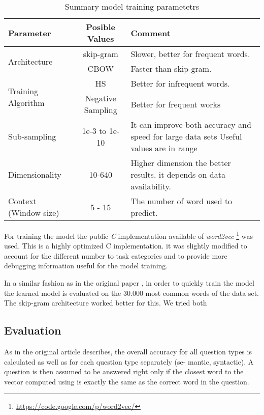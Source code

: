 \begin{table}[h]
   \centering
   \caption{Summary model training parametetrs} 
   \label{tab:word2_vec_parameters}
   
   \small
   \begin{tabular}{ |l|c|p{5cm}| }
   \hline           
    Parameter &  Posible Values & Comment \\  \hline           
    \multirow{2}{*}{Architecture}  & skip-gram  & Slower, better for frequent
    words. \\ 
    \cline{2-3}
    & CBOW  &  Faster than skip-gram. \\ \hline
    \multirow{2}{*}{Training Algorithm}  & \ac{HS}  & Better for infrequent words.   \\ 
    \cline{2-3}
    & Negative Sampling & Better for frequent works \\ \hline
    Sub-sampling  & 1e-3 to 1e-10  &  It  can improve both accuracy and speed for large data
    sets Useful values are in range \\ \hline
    Dimensionality  & 10-640 & Higher dimension the better results. 
    it depends on data availability.  \\ \hline
    Context (Window size)  & 5 - 15 & The number of word used to predict. \\ \hline

    
\end{tabular}
\end{table}

For training  the model the public \emph{C} implementation available of
\textit{word2vec} \footnote{\url{https://code.google.com/p/word2vec/}} was
used.  This is a highly optimized C implementation. it was slightly modified to account for the different
number to task categories and to provide more debugging information useful
for the model training. 

In a similar fashion as in the original paper
\cite{DBLP:journals/corr/abs-1301-3781},  in order to quickly train the model
the  learned model is evaluated on  the 30.000 most common words of the
data set. The skip-gram architecture worked better for this.  We tried both 

\subsection{Evaluation}
\label{experiments:sub:evaluation}

As in the original article describes, the overall accuracy for all question
types is calculated as well as  for each question type separately (se-
mantic, syntactic). A question is then assumed to be answered right  only if the closest word to the
vector computed using  is exactly the same as the correct word in the
question. 
 
